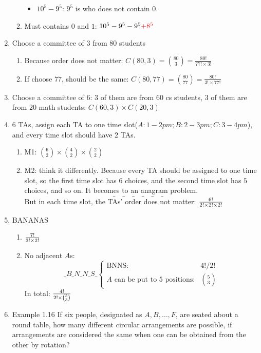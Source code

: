 \documentclass[a4paper]{article}
\begin{document}
\begin{enumerate}
\begin{enumerate}
\begin{itemize}
            \item $10^5 - 9^5$: $9^5$ is who does not contain $0$.
        \end{itemize}
        \item Must contains $0$ and $1$: $10^5-9^5-9^5\color{red}{+8^5}$
    \end{enumerate}
    \item Choose a committee of $3$ from $80$ students
    \begin{enumerate}
        \item Because order does not matter: $C(80,3)=\binom{80}{3}=\frac{80!}{77!\times 3!}$
        \item If choose $77$, should be the same: $C(80,77)=\binom{80}{77}=\frac{80!}{3!\times 77!}$
    \end{enumerate}
    \item Choose a committee of $6$: $3$ of them are from $60$ cs students, $3$ of them are from $20$ math students: $C(60,3)\times C(20,3)$
    \item $6$ TAs, assign each TA to one time slot($A: 1-2pm; B: 2-3pm; C:3-4pm$), and every time slot should have $2$ TAs.
    \begin{enumerate}
        \item M1: $\binom{6}{2} \times \binom{4}{2} \times \binom{2}{2}$
        \item M2: think it differently. Because every TA should be assigned to one time slot, so the first time slot has $6$ choices, and the second time slot has $5$ choices, and so on. It becomes to an anagram problem.
        $$
        \_\quad \_\quad \_\quad \_\quad \_\quad \_\quad
        $$
        But in each time slot, the TAs’ order does not matter: ${6!\over2!\times2!\times2!}$
    \end{enumerate}
    \item BANANAS
    \begin{enumerate}
        \item $7!\over3!\times2!$
        \item No adjacent $A$s:
        $$
        \_B\_N\_N\_S\_
         \begin{cases}
         \text{BNNS}:  & 4!/2! \\
         A \text{ can be put to 5 positions:} & \binom{5}{3}
         \end{cases}
        $$
        In total: $4!\over2! \times\binom{5}{3}$
    \end{enumerate}
    \item Example 1.16 If six people, designated as $A,B,\ldots,F$, are seated about a round table, how many different circular arrangements are possible, if arrangements are considered the same when one can be obtained from the other by rotation?\\

\end{enumerate}
\end{document}
